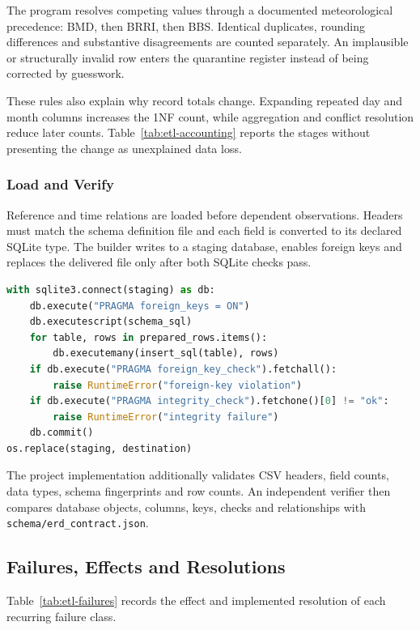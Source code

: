 The program resolves competing values through a documented meteorological
precedence: BMD, then BRRI, then BBS. Identical duplicates, rounding
differences and substantive disagreements are counted separately. An
implausible or structurally invalid row enters the quarantine register instead
of being corrected by guesswork.

These rules also explain why record totals change. Expanding repeated day and
month columns increases the 1NF count, while aggregation and conflict
resolution reduce later counts. Table~\ref{tab:etl-accounting} reports the
stages without presenting the change as unexplained data loss.

\subsubsection{Load and Verify}

Reference and time relations are loaded before dependent observations.
Headers must match the schema definition file and each field is converted to
its declared SQLite type. The builder writes to a staging database, enables
foreign keys and replaces the delivered file only after both SQLite checks
pass.

\begin{lstlisting}[language=Python,caption={Core guarded load used by the database builder},
label={lst:etl-load}]
with sqlite3.connect(staging) as db:
    db.execute("PRAGMA foreign_keys = ON")
    db.executescript(schema_sql)
    for table, rows in prepared_rows.items():
        db.executemany(insert_sql(table), rows)
    if db.execute("PRAGMA foreign_key_check").fetchall():
        raise RuntimeError("foreign-key violation")
    if db.execute("PRAGMA integrity_check").fetchone()[0] != "ok":
        raise RuntimeError("integrity failure")
    db.commit()
os.replace(staging, destination)
\end{lstlisting}

The project implementation additionally validates CSV headers, field counts,
data types, schema fingerprints and row counts. An independent verifier then
compares database objects, columns, keys, checks and relationships with
\texttt{schema/erd\_contract.json}.

\subsection{Failures, Effects and Resolutions}
\label{subsec:etl-failures}

Table~\ref{tab:etl-failures} records the effect and implemented resolution of
each recurring failure class.


